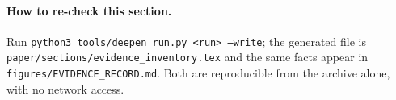 \paragraph{How to re-check this section.} Run \texttt{python3 tools/deepen\_run.py <run> --write}; the generated file is \texttt{paper/sections/evidence\_inventory.tex} and the same facts appear in \texttt{figures/EVIDENCE\_RECORD.md}. Both are reproducible from the archive alone, with no network access.
